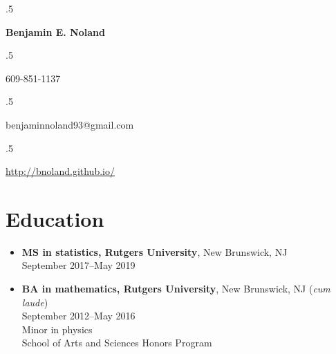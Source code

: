 \documentclass[letterpaper,12pt]{article}
\begin{document}
\moveleft.5\hoffset\centerline{\Large\bf Benjamin E. Noland}
\smallskip
\moveleft.5\hoffset\centerline{609-851-1137}
\moveleft.5\hoffset\centerline{benjaminnoland93@gmail.com}
\moveleft.5\hoffset\centerline{\url{http://bnoland.github.io/}}

\section*{Education}

\begin{itemize}
\item \textbf{MS in statistics, Rutgers University}, New Brunswick, NJ \\
  September 2017--May 2019

\item \textbf{BA in mathematics, Rutgers University}, New Brunswick, NJ
  (\textit{cum laude}) \\
  September 2012--May 2016 \\
  Minor in physics \\
  School of Arts and Sciences Honors Program
\end{itemize}

\iffalse
\subsection*{Selection of coursework:}

\begin{itemize}
\item \textbf{Mathematics:} Calculus, linear algebra, ordinary
  differential equations, real analysis, complex variables,
  differential geometry, linear programming, abstract algebra,
  topology \textit{(taken at Rutgers University)}

\item \textbf{Physics:} Classical mechanics, electromagnetism,
  astrophysics \textit{(taken at Rutgers University)}

\item \textbf{Computer science:} Systems programming, data structures
  and algorithms \textit{(taken at Princeton University while in high
    school)}; Advanced Placement computer science \textit{(taken in
    high school)}

\item \textbf{Statistics:} Advanced Placement statistics
  \textit{(taken in high school)}, probability theory, regression
  analysis \textit{(taking at Rutgers University)}

\end{itemize}
\fi
\end{document}
